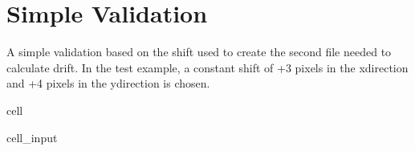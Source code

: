 \documentclass[letterpaper,10pt,english]{jupyterBook}
\begin{document}
\section{Simple Validation}
\label{\detokenize{CIMR_L2_Sea_Ice_Drift_performanceAssessment:simple-validation}}
\sphinxAtStartPar
A simple validation based on the shift used to create the second file needed to calculate drift. In the test example, a constant shift of +3 pixels in the x\sphinxhyphen{}direction and +4 pixels in the y\sphinxhyphen{}direction is chosen.

\begin{sphinxuseclass}{cell}\begin{sphinxVerbatimInput}

\begin{sphinxuseclass}{cell_input}
\begin{sphinxVerbatim}[commandchars=\\\{\}]
  


\end{sphinxVerbatim}
\end{sphinxuseclass}
\end{sphinxVerbatimInput}
\end{sphinxuseclass}
\end{document}
